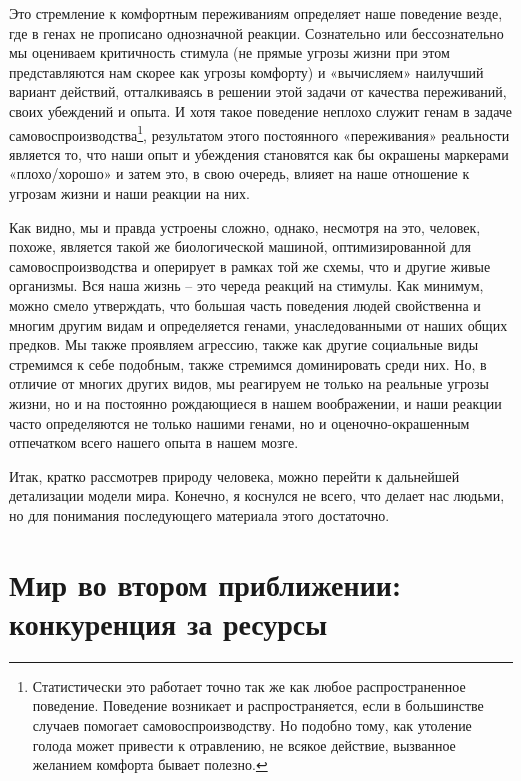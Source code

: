 \documentclass[12pt,a4paper]{report}
\begin{document}
\noindent Это стремление к комфортным переживаниям определяет наше поведение везде, где в генах не прописано однозначной реакции. Сознательно или бессознательно мы оцениваем критичность стимула (не прямые угрозы жизни при этом представляются нам скорее как угрозы комфорту) и «вычисляем» наилучший вариант действий, отталкиваясь в решении этой задачи от качества переживаний, своих убеждений и опыта. И хотя такое поведение неплохо служит генам в задаче самовоспроизводства\footnote{Статистически это работает точно так же как любое распространенное поведение. Поведение возникает и распространяется, если в большинстве случаев помогает самовоспроизводству. Но подобно тому, как утоление голода может привести к отравлению, не всякое действие, вызванное желанием комфорта бывает полезно.}, результатом этого постоянного «переживания» реальности является то, что наши опыт и убеждения становятся как бы окрашены маркерами «плохо/хорошо» и затем это, в свою очередь, влияет на наше отношение к угрозам жизни и наши реакции на них.

\noindent Как видно, мы и правда устроены сложно, однако, несмотря на это, человек, похоже, является такой же биологической машиной, оптимизированной для самовоспроизводства и оперирует в рамках той же схемы, что и другие живые организмы. Вся наша жизнь -- это череда реакций на стимулы. Как минимум, можно смело утверждать, что большая часть поведения людей свойственна и многим другим видам и определяется генами, унаследованными от наших общих предков. Мы также проявляем агрессию, также как другие социальные виды стремимся к себе подобным, также стремимся доминировать среди них. Но, в отличие от многих других видов, мы реагируем не только на реальные угрозы жизни, но и на постоянно рождающиеся в нашем воображении, и наши реакции часто определяются не только нашими генами, но и оценочно-окрашенным отпечатком всего нашего опыта в нашем мозге.

\noindent Итак, кратко рассмотрев природу человека, можно перейти к дальнейшей детализации модели мира. Конечно, я коснулся не всего, что делает нас людьми, но для понимания последующего материала этого достаточно.

\section*{Мир во втором приближении:\\конкуренция за ресурсы}
\end{document}
